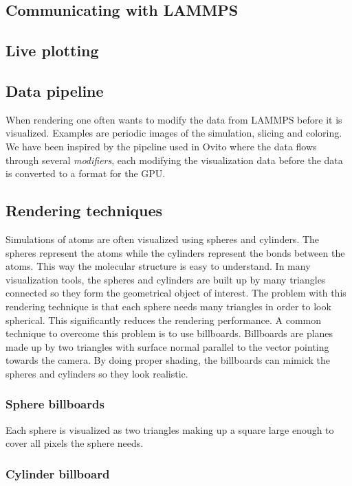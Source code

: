 \documentclass[aps,pre,twocolumn,letterpaper,floatfix]{revtex4}
\begin{document}
\subsection{Communicating with LAMMPS}

\subsection{Live plotting}

\subsection{Data pipeline}
When rendering one often wants to modify the data from LAMMPS before it is visualized. Examples are periodic images of the simulation, slicing and coloring. We have been inspired by the pipeline used in Ovito where the data flows through several \textit{modifiers}, each modifying the visualization data before the data is converted to a format for the GPU.

\subsection{Rendering techniques}
Simulations of atoms are often visualized using spheres and cylinders. The spheres represent the atoms while the cylinders represent the bonds between the atoms. This way the molecular structure is easy to understand. In many visualization tools, the spheres and cylinders are built up by many triangles connected so they form the geometrical object of interest. The problem with this rendering technique is that each sphere needs many triangles in order to look spherical. This significantly reduces the rendering performance. A common technique to overcome this problem is to use billboards. Billboards are planes made up by two triangles with surface normal parallel to the vector pointing towards the camera. By doing proper shading, the billboards can mimick the spheres and cylinders so they look realistic.

\subsubsection*{Sphere billboards}
Each sphere is visualized as two triangles making up a square large enough to cover all pixels the sphere needs. 

\subsubsection*{Cylinder billboard}
\end{document}
